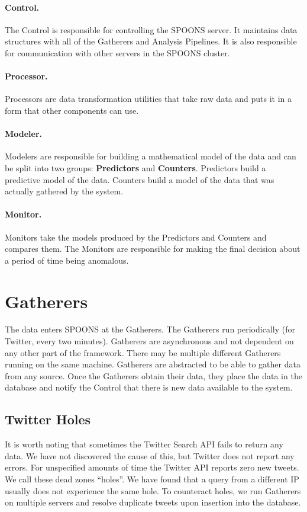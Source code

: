 \documentclass[12pt]{ucthesis}
\begin{document}
\paragraph{Control.}
The Control is responsible for controlling the SPOONS server. It maintains data structures with all of the Gatherers and
Analysis Pipelines. It is also responsible for communication with other servers in the SPOONS cluster.

\paragraph{Processor.}
Processors are data transformation utilities that take raw data and puts it in a form that other components can use.

\paragraph{Modeler.}
Modelers are responsible for building a mathematical model of the data and can be split into two groups: \textbf{Predictors} and \textbf{Counters}.
Predictors build a predictive model of the data. Counters build a model of the data that was actually gathered by the system.

\paragraph{Monitor.}
Monitors take the models produced by the Predictors and Counters and compares them. The Monitors are responsible for
making the final decision about a period of time being anomalous.

\section{Gatherers}
\label{arch-gatherers}
The data enters SPOONS at the Gatherers. The Gatherers run periodically (for Twitter, every two minutes).
Gatherers are asynchronous and not dependent on any other part of the framework. There may be multiple different
Gatherers running on the same machine. Gatherers are abstracted to be able to gather data from any source.
Once the Gatherers obtain their data, they place the data in the database and notify the Control that there is new data
available to the system.

\subsection{Twitter Holes}
\label{arch-twitter-holes}
It is worth noting that sometimes the Twitter Search API fails to return any data. We have not discovered the cause
of this, but Twitter does not report any errors. For unspecified amounts of time the Twitter API reports zero
new tweets. We call these dead zones ``holes''. We have found that a query from a different IP usually does not
experience the same hole. To counteract holes, we run Gatherers on multiple servers and resolve duplicate tweets upon insertion
into the database.
\end{document}
